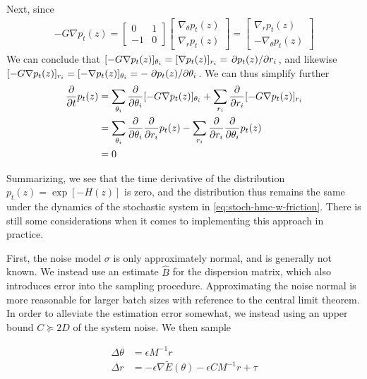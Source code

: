Next, since 
\begin{align*}
    -G\nabla p_t(z) = \begin{bmatrix}0 & 1 \\ -1 & 0 \end{bmatrix}
    \begin{bmatrix}
        \nabla_\theta p_t(z) \\ 
        \nabla_r p_t(z)
    \end{bmatrix} = \begin{bmatrix}
        \nabla_r p_t(z) \\
        -\nabla_\theta p_t(z) 
    \end{bmatrix}
\end{align*}
We can conclude that $[-G\nabla p_t(z)]_{\theta_i} = [\nabla p_t(z)]_{r_i} = \pdv*{p_t(z)}{r_i}$, and likewise $[-G\nabla p_t(z)]_{r_i} = [-\nabla p_t(z)]_{\theta_i} =-\pdv*{p_t(z)}{\theta_i}$.
We can thus simplify further
\begin{align*}
    \pdv{t} p_t(z) 
    &= \sum_{\theta_i} \pdv{\theta_i} [ -G\nabla p_t(z)]_{\theta_i}
    + \sum_{r_i} \pdv{r_i} [ -G\nabla p_t(z)]_{r_i} \\
    &= \sum_{\theta_i} \pdv{\theta_i} \pdv{r_i} p_t(z)
    - \sum_{r_i} \pdv{r_i} \pdv{\theta_i} p_t(z)\\
    &= 0
\end{align*}

Summarizing, we see that the time derivative of the distribution $p_t(z)=\exp[-H(z)]$ is zero, and the distribution thus remains the same under the dynamics of the stochastic system in \cref{eq:stoch-hmc-w-friction}. 
There is still some considerations when it comes to implementing this approach in practice. 

First, the noise model $\sigma$ is only approximately normal, and is generally not known.
We instead use an estimate $\hat{B}$ for the dispersion matrix, which also introduces error into the sampling procedure. 
Approximating the noise normal is more reasonable for larger batch sizes with reference to the central limit theorem.
In order to alleviate the estimation error somewhat, we instead using an upper bound $C \succeq 2D$ of the system noise.
We then sample

\begin{align}
    \Delta \theta &=  \epsilon M^{-1} r\\
    \Delta r &=  -\epsilon\nabla\tilde{E}(\theta) - \epsilon CM^{-1}r  + \tau
\end{align}

